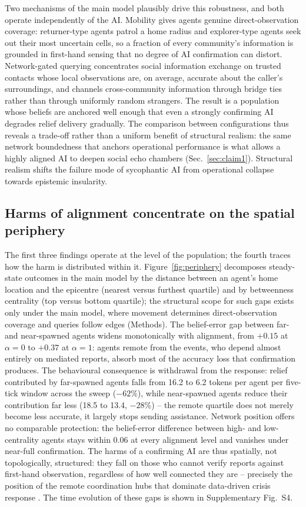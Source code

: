 \documentclass[pdflatex,sn-nature]{sn-jnl}
\begin{document}
Two mechanisms of the main model plausibly drive this robustness, and both operate independently of the AI. Mobility gives agents genuine direct-observation coverage: returner-type agents patrol a home radius and explorer-type agents seek out their most uncertain cells, so a fraction of every community's information is grounded in first-hand sensing that no degree of AI confirmation can distort. Network-gated querying concentrates social information exchange on trusted contacts whose local observations are, on average, accurate about the caller's surroundings, and channels cross-community information through bridge ties rather than through uniformly random strangers. The result is a population whose beliefs are anchored well enough that even a strongly confirming AI degrades relief delivery gradually. The comparison between configurations thus reveals a trade-off rather than a uniform benefit of structural realism: the same network boundedness that anchors operational performance is what allows a highly aligned AI to deepen social echo chambers (Sec.~\ref{sec:claim1}). Structural realism shifts the failure mode of sycophantic AI from operational collapse towards epistemic insularity.

\subsection{Harms of alignment concentrate on the spatial periphery}\label{sec:claim4}

The first three findings operate at the level of the population; the fourth traces how the harm is distributed within it. Figure~\ref{fig:periphery} decomposes steady-state outcomes in the main model by the distance between an agent's home location and the epicentre (nearest versus furthest quartile) and by betweenness centrality (top versus bottom quartile); the structural scope for such gaps exists only under the main model, where movement determines direct-observation coverage and queries follow edges (Methods). The belief-error gap between far- and near-spawned agents widens monotonically with alignment, from $+0.15$ at $\alpha = 0$ to $+0.37$ at $\alpha = 1$: agents remote from the events, who depend almost entirely on mediated reports, absorb most of the accuracy loss that confirmation produces. The behavioural consequence is withdrawal from the response: relief contributed by far-spawned agents falls from 16.2 to 6.2 tokens per agent per five-tick window across the sweep ($-62\%$), while near-spawned agents reduce their contribution far less (18.5 to 13.4, $-28\%$) -- the remote quartile does not merely become less accurate, it largely stops sending assistance. Network position offers no comparable protection: the belief-error difference between high- and low-centrality agents stays within 0.06 at every alignment level and vanishes under near-full confirmation. The harms of a confirming AI are thus spatially, not topologically, structured: they fall on those who cannot verify reports against first-hand observation, regardless of how well connected they are -- precisely the position of the remote coordination hubs that dominate data-driven crisis response \citep{comes2020coordination,coleman2024weaving}. The time evolution of these gaps is shown in Supplementary Fig.~S4.
\end{document}
